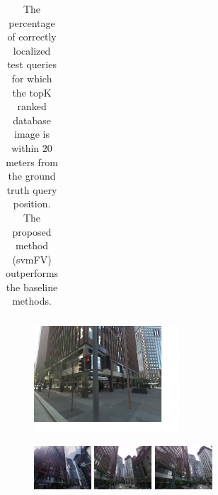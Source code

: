 \documentclass[table]{article} %
\begin{document}
\begin{table}[t!]
\begin{centering}
\begin{tabularx}{0.94\linewidth}{|l|c c c c c|c c c c c|}
	\end{tabularx}
	\caption{ \textcolor{myRed}{}
		The percentage of correctly localized test queries for which the topK ranked database image is within $20$ meters from the ground truth query position. The proposed method (svmFV) outperforms the baseline methods.
		}
    	\label{tab:recall}
    \end{centering}
    \end{table}


    \begin{figure}
        \begin{minipage}{0.34\linewidth}
            \centering
            \vspace{5mm}
            \includegraphics[height=40mm]{imgs/ex1/query}
        \end{minipage}
        \begin{minipage}{0.75\linewidth}
            \begin{minipage}{\linewidth} 
                \colorbox{myGreen}{\includegraphics[height=16mm]{imgs/ex1/FVsvm1}}
                \colorbox{myGreen}{\includegraphics[height=16mm]{imgs/ex1/FVsvm2}}
                \colorbox{myGreen}{\includegraphics[height=16mm]{imgs/ex1/FVsvm3}}

\end{minipage}
\end{minipage}
\end{figure}
\end{document}
